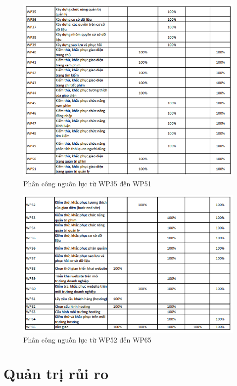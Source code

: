 \documentclass[a4paper]{book}
\begin{document}
\begin{figure}[h!]
	\centering
	\includegraphics[width=0.7\textheight]{RP_35_51.png}
	\caption{Phân công nguồn lực từ WP35 đến WP51}
	\label{fig:RP_35_51}
\end{figure}
\begin{figure}[h!]
	\centering
	\includegraphics[width=0.7\textheight]{RP_52_65.png}
	\caption{Phân công nguồn lực từ WP52 đến WP65}
	\label{fig:RP_52_65}
\end{figure}
\chapter{Quản trị rủi ro}
\newpage
\listoftables
\listoffigures
\newpage
 

\end{document}
